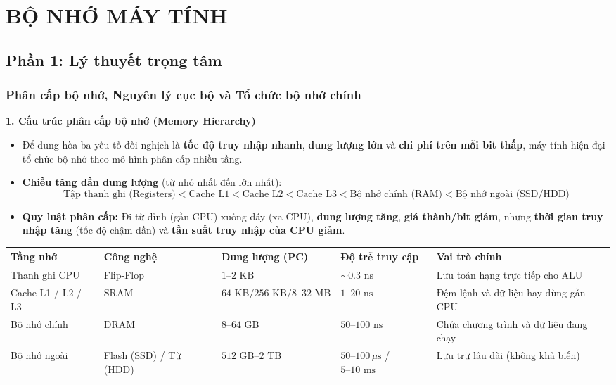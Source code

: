 \chapter{BỘ NHỚ MÁY TÍNH}

\section{Phần 1: Lý thuyết trọng tâm}

\subsection{Phân cấp bộ nhớ, Nguyên lý cục bộ và Tổ chức bộ nhớ chính}

\textbf{1. Cấu trúc phân cấp bộ nhớ (Memory Hierarchy)}
\begin{itemize}
    \item Để dung hòa ba yếu tố đối nghịch là \textbf{tốc độ truy nhập nhanh}, \textbf{dung lượng lớn} và \textbf{chi phí trên mỗi bit thấp}, máy tính hiện đại tổ chức bộ nhớ theo mô hình phân cấp nhiều tầng.
    \item \textbf{Chiều tăng dần dung lượng} (từ nhỏ nhất đến lớn nhất):
    $$\text{Tập thanh ghi (Registers)} < \text{Cache L1} < \text{Cache L2} < \text{Cache L3} < \text{Bộ nhớ chính (RAM)} < \text{Bộ nhớ ngoài (SSD/HDD)}$$
    \item \textbf{Quy luật phân cấp:} Đi từ đỉnh (gần CPU) xuống đáy (xa CPU), \textbf{dung lượng tăng}, \textbf{giá thành/bit giảm}, nhưng \textbf{thời gian truy nhập tăng} (tốc độ chậm dần) và \textbf{tần suất truy nhập của CPU giảm}.
\end{itemize}

\begin{tcolorbox}[bwbox, title={Thông số tham khảo phân cấp bộ nhớ trên máy tính PC / Server (CA.RISCV.2025)}]
\begin{center}
\renewcommand{\arraystretch}{1.2}
\small
\begin{tabularx}{\linewidth}{|L{3.0cm}|Z|Z|Z|Y|}
\hline
\textbf{Tầng nhớ} & \textbf{Công nghệ} & \textbf{Dung lượng (PC)} & \textbf{Độ trễ truy cập} & \textbf{Vai trò chính} \\ \hline
Thanh ghi CPU & Flip-Flop & $1\text{--}2\text{ KB}$ & $\sim 0.3\text{ ns}$ & Lưu toán hạng trực tiếp cho ALU \\ \hline
Cache L1 / L2 / L3 & SRAM & $64\text{ KB} / 256\text{ KB} / 8\text{--}32\text{ MB}$ & $1\text{--}20\text{ ns}$ & Đệm lệnh và dữ liệu hay dùng gần CPU \\ \hline
Bộ nhớ chính & DRAM & $8\text{--}64\text{ GB}$ & $50\text{--}100\text{ ns}$ & Chứa chương trình và dữ liệu đang chạy \\ \hline
Bộ nhớ ngoài & Flash (SSD) / Từ (HDD) & $512\text{ GB}\text{--}2\text{ TB}$ & $50\text{--}100\,\mu\text{s}$ / $5\text{--}10\text{ ms}$ & Lưu trữ lâu dài (không khả biến) \\ \hline
\end{tabularx}
\end{center}
\end{tcolorbox}

